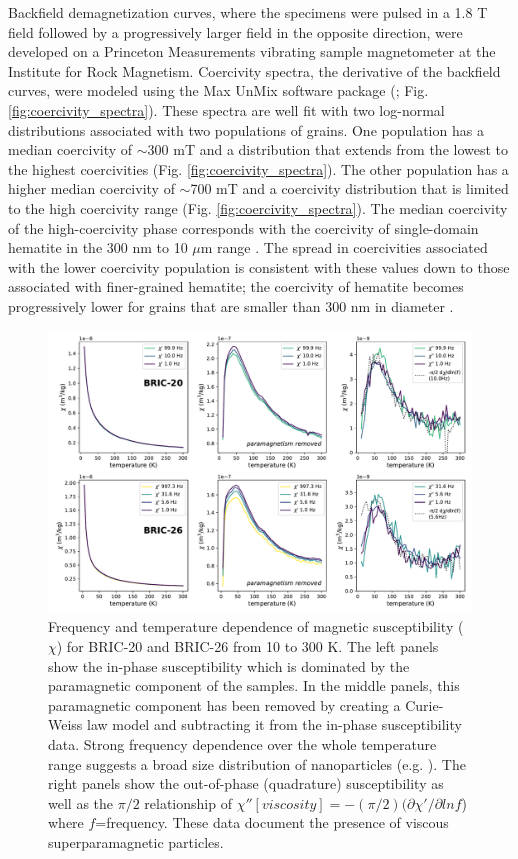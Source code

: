 \documentclass[draft]{agujournal2018}
\begin{document}
Backfield demagnetization curves, where the specimens were pulsed in a 1.8 T field followed by a progressively larger field in the opposite direction, were developed on a Princeton Measurements vibrating sample magnetometer at the Institute for Rock Magnetism. Coercivity spectra, the derivative of the backfield curves, were modeled using the Max UnMix software package (\citealp{Maxbauer2016a}; Fig. \ref{fig:coercivity_spectra}). These spectra are well fit with two log-normal distributions associated with two populations of grains. One population has a median coercivity of $\sim$300 mT and a distribution that extends from the lowest to the highest coercivities (Fig. \ref{fig:coercivity_spectra}). The other population has a higher median coercivity of $\sim$700 mT and a coercivity distribution that is limited to the high coercivity range (Fig. \ref{fig:coercivity_spectra}). The median coercivity of the high-coercivity phase corresponds with the coercivity of single-domain hematite in the 300 nm to 10 $\mu$m range \citep{Ozdemir2014a}. The spread in coercivities associated with the lower coercivity population is consistent with these values down to those associated with finer-grained hematite; the coercivity of hematite becomes progressively lower for grains that are smaller than 300 nm in diameter \citep{Ozdemir2014a}.

\begin{figure}[!ht]
\noindent\includegraphics[width=\textwidth]{figures/low_temp_ac}
\caption{\small{Frequency and temperature dependence of magnetic susceptibility ($\chi$) for BRIC-20 and BRIC-26 from 10 to 300 K. The left panels show the in-phase susceptibility which is dominated by the paramagnetic component of the samples. In the middle panels, this paramagnetic component has been removed by creating a Curie-Weiss law model and subtracting it from the in-phase susceptibility data. Strong frequency dependence over the whole temperature range suggests a broad size distribution of nanoparticles (e.g. \citealp{Jackson2012a}). The right panels show the out-of-phase (quadrature) susceptibility as well as the $\pi/2$ relationship of $\chi''[viscosity] = -(\pi/2)(\partial \chi'/\partial lnf$) where $f$=frequency. These data document the presence of viscous superparamagnetic particles.}}
\label{fig:low_temp_ac}
\end{figure}
\end{document}
